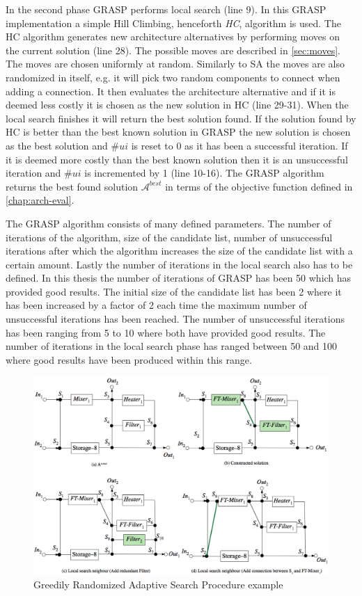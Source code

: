 In the second phase GRASP performs local search (line 9). In this GRASP implementation a simple Hill Climbing, henceforth \emph{HC}, algorithm is used. The HC algorithm generates new architecture alternatives by performing moves on the current solution (line 28). The possible moves are described in \autoref{sec:moves}. The moves are chosen uniformly at random. Similarly to SA the moves are also randomized in itself, e.g. it will pick two random components to connect when adding a connection. It then evaluates the architecture alternative and if it is deemed less costly it is chosen as the new solution in HC (line 29-31). When the local search finishes it will return the best solution found. If the solution found by HC is better than the best known solution in GRASP the new solution is chosen as the best solution and $\#ui$ is reset to 0 as it has been a successful iteration. If it is deemed more costly than the best known solution then it is an unsuccessful iteration and $\#ui$ is incremented by 1 (line 10-16). The GRASP algorithm returns the best found solution $\mathcal{A}^{best}$ in terms of the objective function defined in \autoref{chap:arch-eval}.

The GRASP algorithm consists of many defined parameters. The number of iterations of the algorithm, size of the candidate list, number of unsuccessful iterations after which the algorithm increases the size of the candidate list with a certain amount. Lastly the number of iterations in the local search also has to be defined. In this thesis the number of iterations of GRASP has been 50 which has provided good results. The initial size of the candidate list has been 2 where it has been increased by a factor of 2 each time the maximum number of unsuccessful iterations has been reached. The number of unsuccessful iterations has been ranging from 5 to 10 where both have provided good results. The number of iterations in the local search phase has ranged between 50 and 100 where good results have been produced within this range.

\begin{figure}
\centering
\includegraphics[width=\textwidth]{figures/GRASP-example.png}
\caption[Greedily Randomized Adaptive Search Procedure example]{Greedily Randomized Adaptive Search Procedure example}
\label{fig:grasp-example}
\end{figure}

